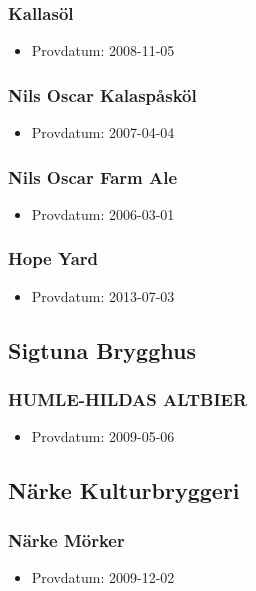 \documentclass[11pt]{article}
\begin{document}
\subsubsection{Kallasöl}
\label{sec:org5ef9d0b}
\begin{itemize}
\item Provdatum: 2008-11-05
\end{itemize}
\subsubsection{Nils Oscar Kalaspåsköl}
\label{sec:orgf322f09}
\begin{itemize}
\item Provdatum: 2007-04-04
\end{itemize}
\subsubsection{Nils Oscar Farm Ale}
\label{sec:org7a40791}
\begin{itemize}
\item Provdatum: 2006-03-01
\end{itemize}
\subsubsection{Hope Yard}
\label{sec:org36b6e10}
\begin{itemize}
\item Provdatum: 2013-07-03
\end{itemize}
\subsection{Sigtuna Brygghus}
\label{sec:orgedc928e}
\subsubsection{HUMLE-HILDAS ALTBIER}
\label{sec:orga20edfc}
\begin{itemize}
\item Provdatum: 2009-05-06
\end{itemize}
\subsection{Närke Kulturbryggeri}
\label{sec:org57340a3}
\subsubsection{Närke Mörker}
\label{sec:org2a3735c}
\begin{itemize}
\item Provdatum: 2009-12-02
\end{itemize}
\end{document}
